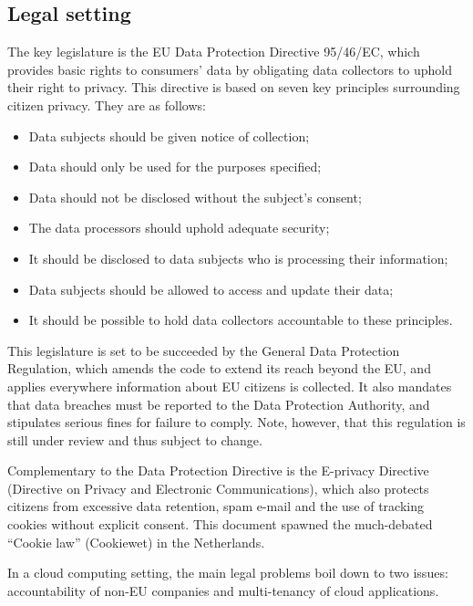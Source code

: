 \documentclass[11pt]{article}
\begin{document}
\subsection{Legal setting}
The key legislature is the EU Data Protection Directive 95/46/EC, which provides basic rights to consumers' data by obligating data collectors to uphold their right to privacy. \cite{directive199595}
This directive is based on seven key principles surrounding citizen privacy.
They are as follows:
\begin{itemize}
\item Data subjects should be given notice of collection;
\item Data should only be used for the purposes specified;
\item Data should not be disclosed without the subject's consent;
\item The data processors should uphold adequate security;
\item It should be disclosed to data subjects who is processing their information;
\item Data subjects should be allowed to access and update their data;
\item It should be possible to hold data collectors accountable to these principles.
\end{itemize}

This legislature is set to be succeeded by the General Data Protection Regulation, which amends the code to extend its reach beyond the EU, and applies everywhere information about EU citizens is collected.
It also mandates that data breaches must be reported to the Data Protection Authority, and stipulates serious fines for failure to comply.
Note, however, that this regulation is still under review and thus subject to change.


Complementary to the Data Protection Directive is the E-privacy Directive (Directive on Privacy and Electronic Communications), which also protects citizens from excessive data retention, spam e-mail and the use of tracking cookies without explicit consent.
This document spawned the much-debated ``Cookie law'' (Cookiewet) in the Netherlands.

In a cloud computing setting, the main legal problems boil down to two issues: accountability of non-EU companies and multi-tenancy of cloud applications.

\end{document}
